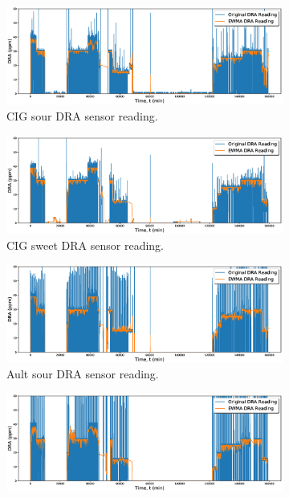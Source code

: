 \begin{figure}
     \centering
     \begin{subfigure}[b]{0.9\textwidth}
         \centering
         \includegraphics[width=\textwidth]{images/08CIGSour.eps}
         \caption{CIG sour DRA sensor reading.}
         \label{fig:08CIGSour}
     \end{subfigure}
     \begin{subfigure}[b]{0.9\textwidth}
         \centering
         \includegraphics[width=\textwidth]{images/08CIGSweet.eps}
         \caption{CIG sweet DRA sensor reading.}
         \label{fig:08CIGSweet}
     \end{subfigure}
     \begin{subfigure}[b]{0.9\textwidth}
         \centering
         \includegraphics[width=\textwidth]{images/08AultSour.eps}
         \caption{Ault sour DRA sensor reading.}
         \label{fig:08AultSour}
     \end{subfigure}
     \begin{subfigure}[b]{0.9\textwidth}
         \centering
         \includegraphics[width=\textwidth]{images/08AultSweet.eps}

\end{subfigure}
\end{figure}
